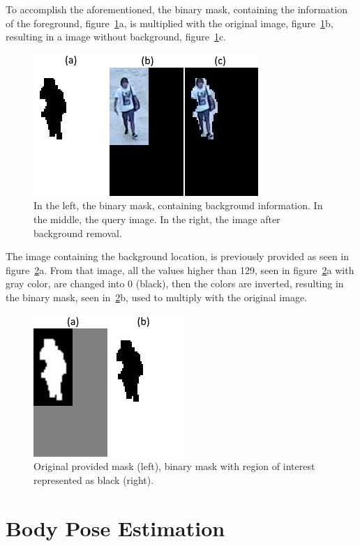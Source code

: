 \documentclass[titlepage,12pt,a4paper,times]{book}
\begin{document}
To accomplish the aforementioned, the binary mask, containing the information
of the foreground, figure~\ref{fig:bic}a, is multiplied with the original
image, figure~\ref{fig:bic}b, resulting in a image without background,
figure~\ref{fig:bic}c.

\begin{figure}[!h]
\centering
\includegraphics[scale=1]{images/3_2_fig1.jpg}
\caption{In the left, the binary mask, containing background information. In the
middle, the query image. In the right, the image after background removal.}
\label{fig:bic}
\end{figure}
\FloatBarrier

The image containing the background location, is previously provided as seen in
figure~\ref{fig:omnm}a. From that image, all the values higher than 129, seen
in figure~\ref{fig:omnm}a with gray color, are changed into 0 (black), then the
colors are inverted, resulting in the binary mask, seen in~\ref{fig:omnm}b,
used to multiply with the original image.

\begin{figure}[!h]
\centering
\includegraphics[scale=1]{images/3_2_fig2.jpg}
\caption{Original provided mask (left), binary mask with region of interest
represented as black (right).}
\label{fig:omnm}
\end{figure}
\FloatBarrier

\section{Body Pose Estimation}
\label{chap3:sec:bps}
\end{document}
